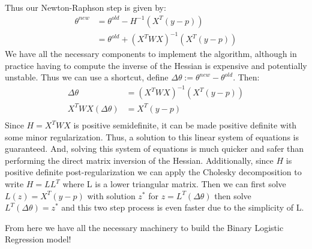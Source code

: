 \documentclass[12pt]{article}
\begin{document}
Thus our Newton-Raphson step is given by:
\begin{align*}
    \theta^{new} &= \theta^{old} - H^{-1}(X^T(y - p)) \\
    &= \theta^{old} + (X^TWX)^{-1}(X^T(y - p))
\end{align*}
We have all the necessary components to implement the algorithm, although in practice
having to compute the inverse of the Hessian is expensive and potentially unstable.
Thus we can use a shortcut, define $\Delta \theta := \theta^{new} - \theta^{old}$. Then:
\begin{align*}
    \Delta \theta &= (X^TWX)^{-1}(X^T(y - p)) \\
    X^TWX(\Delta \theta) &= X^T(y - p) \\
\end{align*}
Since $H = X^TWX$ is positive semidefinite, it can be made positive definite with
some minor regularization. Thus, a solution to this linear system of equations is guaranteed.
And, solving this system of equations is much quicker and safer than performing the direct matrix inversion
of the Hessian. Additionally, since $H$ is positive definite post-regularization we can apply
the Cholesky decomposition to write $H = LL^T$ where L is a lower triangular matrix. Then we can first
solve $L(z) =  X^T(y - p)$ with solution $z^*$ for $z = L^T(\Delta \theta)$ then solve
$L^T(\Delta \theta) = z^*$ and this two step process is even faster due to the
simplicity of L.


From here we have all the necessary machinery to build the Binary Logistic Regression
model!
\end{document}
